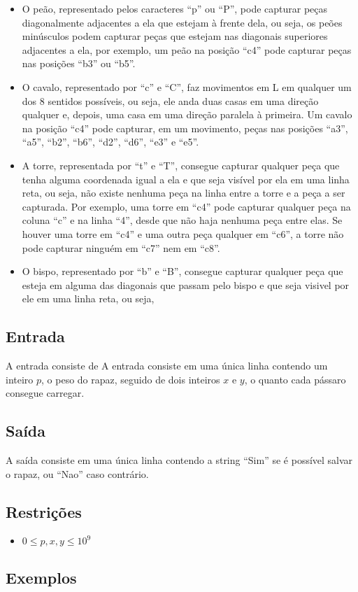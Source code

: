 \begin{itemize}
    \item O peão, representado pelos caracteres ``p'' ou ``P'', pode capturar peças diagonalmente adjacentes a ela que estejam à frente dela, ou seja, os peões minúsculos podem capturar peças que estejam nas diagonais superiores adjacentes a ela, por exemplo, um peão na posição ``c4'' pode capturar peças nas posições ``b3'' ou ``b5''.
    \item O cavalo, representado por ``c'' e ``C'', faz movimentos em L em qualquer um dos 8 sentidos possíveis, ou seja, ele anda duas casas em uma direção qualquer e, depois, uma casa em uma direção paralela à primeira. Um cavalo na posição ``c4'' pode capturar, em um movimento, peças nas posições ``a3'', ``a5'', ``b2'', ``b6'', ``d2'', ``d6'', ``e3'' e ``e5''.
    \item A torre, representada por ``t'' e ``T'', consegue capturar qualquer peça que tenha alguma coordenada igual a ela e que seja visível por ela em uma linha reta, ou seja, não existe nenhuma peça na linha entre a torre e a peça a ser capturada. Por exemplo, uma torre em ``c4'' pode capturar qualquer peça na coluna ``c'' e na linha ``4'', desde que não haja nenhuma peça entre elas. Se houver uma torre em ``c4'' e uma outra peça qualquer em ``c6'', a torre não pode capturar ninguém em ``c7'' nem em ``c8''.
    \item O bispo, representado por ``b'' e ``B'', consegue capturar qualquer peça que esteja em alguma das diagonais que passam pelo bispo e que seja visivel por ele em uma linha reta, ou seja, 
\end{itemize}


\subsection*{Entrada}
\textoDiversasInstanciasEOF

A entrada consiste de 
A entrada consiste em uma única linha contendo um inteiro $p$, o peso do rapaz, seguido de dois inteiros $x$ e $y$, o quanto cada pássaro consegue carregar.


\subsection*{Saída}

A saída consiste em uma única linha contendo a string ``Sim'' se é possível salvar o rapaz, ou ``Nao'' caso contrário.


\subsection*{Restrições}
\begin{itemize}
  \item $0 \leq p, x, y \leq 10^9$
\end{itemize}

\subsection*{Exemplos}


